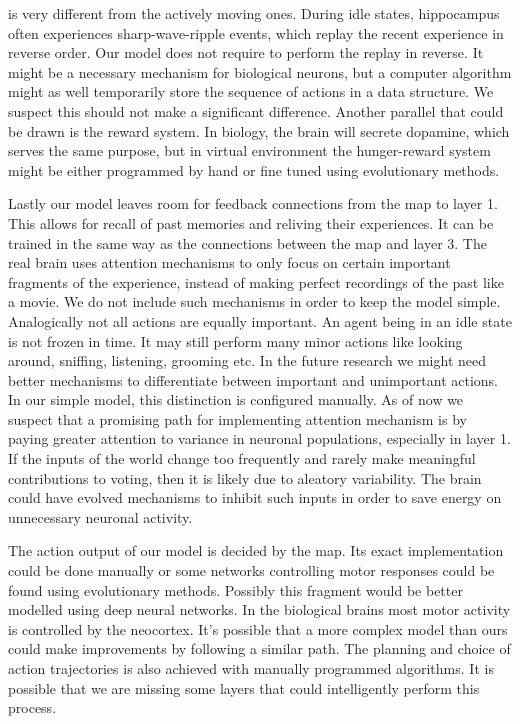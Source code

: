 \documentclass[12pt]{article}
\begin{document}
is very different from the actively moving ones. During idle states, hippocampus often experiences sharp-wave-ripple events, which replay the recent experience in reverse order. Our model does not require to perform the replay in reverse. It might be a necessary mechanism for biological neurons, but a computer algorithm might as well temporarily store the sequence of actions in a data structure. We suspect this should not make a significant difference. Another parallel that could be drawn is the reward system. In biology, the brain will secrete dopamine, which serves the same purpose, but in virtual environment the hunger-reward system might be either programmed by hand or fine tuned using evolutionary methods.  

Lastly our model leaves room for feedback connections from the map to layer 1. This allows for recall of past memories and reliving their experiences. It can be trained in the same way as the connections between the map and layer 3. The real brain uses attention mechanisms to only focus on certain important fragments of the experience, instead of making perfect recordings of the past like a movie. We do not include such mechanisms in order to keep the model simple. Analogically not all actions are equally important. An agent being in an idle state is not frozen in time. It may still perform many minor actions like looking around, sniffing, listening, grooming etc. In the future research we might need better mechanisms to differentiate between important and unimportant actions. In our simple model, this distinction is configured manually.  As of now we suspect that a promising path for implementing attention mechanism is by paying greater attention to variance in neuronal populations, especially in layer 1. If the inputs of the world change too frequently and rarely make meaningful contributions to voting, then it is likely due to aleatory variability. The brain could have evolved mechanisms to inhibit such inputs in order to save energy on unnecessary neuronal activity.

The action output of our model is decided by the map. Its exact implementation could be done manually or some networks controlling motor responses could be found using evolutionary methods. Possibly this fragment would be better modelled using deep neural networks.
In the biological brains most motor activity is controlled by the neocortex. It's possible that a more complex model than ours could make improvements by following a similar path. The planning and choice of action trajectories is also achieved with manually programmed algorithms. It is possible that we are missing some layers that could intelligently perform this process.
\end{document}
